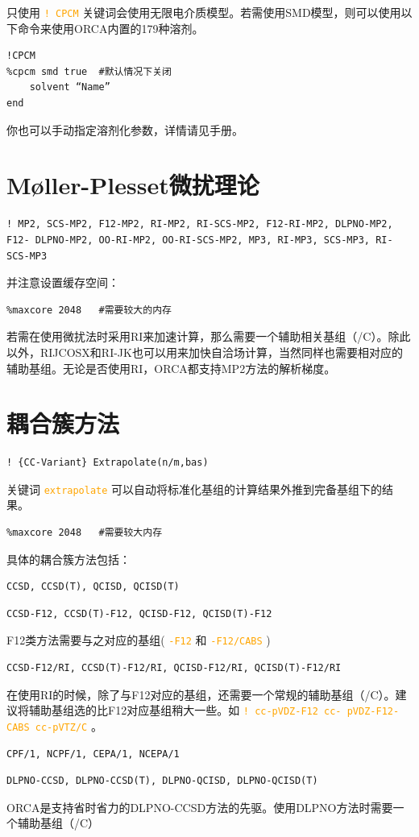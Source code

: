 \documentclass{ctexart}
\newcommand{\cmd}[1]{\textcolor{orange}{ \texttt{#1} }}
\begin{document}
	只使用\cmd{! CPCM}关键词会使用无限电介质模型。若需使用SMD模型，则可以使用以下命令来使用ORCA内置的179种溶剂。
	
	\begin{lstlisting}
!CPCM	
%cpcm smd true	#默认情况下关闭
	solvent “Name”
end
	\end{lstlisting}
	
	你也可以手动指定溶剂化参数，详情请见手册。
	
	\section{Møller-Plesset微扰理论} 
	\begin{lstlisting}
! MP2, SCS-MP2, F12-MP2, RI-MP2, RI-SCS-MP2, F12-RI-MP2, DLPNO-MP2, F12- DLPNO-MP2, OO-RI-MP2, OO-RI-SCS-MP2, MP3, RI-MP3, SCS-MP3, RI-SCS-MP3
	\end{lstlisting}
	
	并注意设置缓存空间：
	\begin{lstlisting}
%maxcore 2048	#需要较大的内存
	\end{lstlisting}
	
	若需在使用微扰法时采用RI来加速计算，那么需要一个辅助相关基组（/C）。除此以外，RIJCOSX和RI-JK也可以用来加快自洽场计算，当然同样也需要相对应的辅助基组。无论是否使用RI，ORCA都支持MP2方法的解析梯度。
	
	\section{耦合簇方法} 
	\begin{lstlisting}
! {CC-Variant} Extrapolate(n/m,bas)
	\end{lstlisting}
	
	关键词\cmd{extrapolate}可以自动将标准化基组的计算结果外推到完备基组下的结果。
	
	\begin{lstlisting}
%maxcore 2048	#需要较大内存
	\end{lstlisting}
	
	具体的耦合簇方法包括：
	\begin{lstlisting}
CCSD, CCSD(T), QCISD, QCISD(T)
	\end{lstlisting}
	
	\begin{lstlisting}
CCSD-F12, CCSD(T)-F12, QCISD-F12, QCISD(T)-F12
	\end{lstlisting}
	
	F12类方法需要与之对应的基组(\cmd{-F12}和\cmd{-F12/CABS})
	\begin{lstlisting}
CCSD-F12/RI, CCSD(T)-F12/RI, QCISD-F12/RI, QCISD(T)-F12/RI
	\end{lstlisting}
	在使用RI的时候，除了与F12对应的基组，还需要一个常规的辅助基组（/C）。建议将辅助基组选的比F12对应基组稍大一些。如\cmd{! cc-pVDZ-F12 cc- pVDZ-F12-CABS cc-pVTZ/C}。
	\begin{lstlisting}
CPF/1, NCPF/1, CEPA/1, NCEPA/1
	\end{lstlisting}
	\begin{lstlisting}
DLPNO-CCSD, DLPNO-CCSD(T), DLPNO-QCISD, DLPNO-QCISD(T)
	\end{lstlisting}
	ORCA是支持省时省力的DLPNO-CCSD方法的先驱。使用DLPNO方法时需要一个辅助基组（/C）
	
\end{document}
